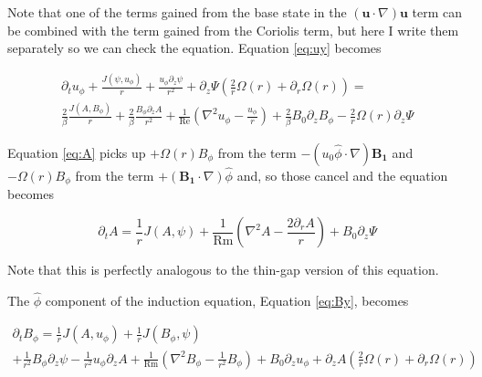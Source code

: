 \documentclass{paper}
\newcommand{\beq}{\begin{equation}}
\newcommand{\eeq}{\end{equation}}
\newcommand{\uphi}{\ensuremath{u_\phi}}
\newcommand\reye{\mathrm{Re}}
\newcommand\reym{\mathrm{Rm}}
\begin{document}
Note that one of the terms gained from the base state in the $(\mathbf{u}\cdot \nabla)\mathbf{u}$ term can be combined with the term gained from the Coriolis term, but here I write them separately so we can check the equation.
Equation \ref{eq:uy} becomes

\begin{multline}
  \label{eq:uy_perturbed}
\partial_t \uphi + \frac{J(\psi, \uphi)}{r} + \frac{\uphi \partial_z \psi}{r^2} + \partial_z\Psi\left( \frac{2}{r}\Omega(r) + \partial_r \Omega(r) \right) = \\
\frac{2}{\beta} \frac{J(A, B_\phi)}{r} + \frac{2}{\beta} \frac{B_\phi \partial_z A}{r^2} + \frac{1}{\reye} \left( \nabla^2 \uphi - \frac{\uphi}{r}\right) + \frac{2}{\beta} B_0 \partial_z B_\phi -\frac{2}{r} \Omega(r) \partial_z \Psi
\end{multline}




Equation \ref{eq:A} picks up $+\Omega(r) B_\phi$ from the term $- ({u_0}\hat{\phi} \cdot \nabla)\mathbf{B_1}$ and $-\Omega(r) B_\phi$ from the term $+(\mathbf{B_1} \cdot \nabla) \hat{\phi}$ and, so those cancel and the equation becomes

\beq
 \label{eq:A_perturbed}
\partial_t A = \frac{1}{r} J(A, \psi) + \frac{1}{\reym} \left( \nabla^2 A - \frac{2 \partial_r A}{r} \right) + B_0 \partial_z \Psi
\eeq

Note that this is perfectly analogous to the thin-gap version of this equation.

The $\hat{\phi}$ component of the induction equation, Equation \ref{eq:By}, becomes

\begin{multline}
  \label{eq:By_perturbed}
\partial_t B_\phi = \frac{1}{r} J(A, \uphi) + \frac{1}{r} J(B_\phi, \psi)\\
+ \frac{1}{r^2} B_\phi \partial_z \psi - \frac{1}{r^2} \uphi \partial_z A + \frac{1}{\reym} \left(\nabla^2 B_\phi - \frac{1}{r^2} B_\phi \right) + B_0 \partial_z u_\phi + \partial_z A \left( \frac{2}{r}\Omega(r) + \partial_r \Omega(r) \right) %
\end{multline}
\end{document}
